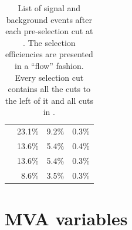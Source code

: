 \begin{table}[!tbp]
\begin{tabular}{lrrr}
\hline
\gammagamma{\Pphoton}{\BS}{\Pphoton}{\BS}{ \Pquark \Pquark \Pquark \Pquark}& 23.1\% & 9.2\%  & 0.3\%\\
\gammagamma{\Pphoton}{\BS}{\Pphoton}{\EPA}{ \Pquark \Pquark \Pquark \Pquark}& 13.6\% & 5.4\%  &0.4\%\\
\gammagamma{\Pphoton}{\EPA}{\Pphoton}{\BS}{ \Pquark \Pquark \Pquark \Pquark}& 13.6\% & 5.4\% & 0.3\%\\
\gammagamma{\Pphoton}{\EPA}{\Pphoton}{\EPA}{ \Pquark \Pquark \Pquark \Pquark}& 8.6\% & 3.5\% & 0.3\% \\
\hline \hline
\end{tabular}
\caption[List of signal and background samples after pre-selection cuts at .]
{List of signal and background events after each pre-selection cut at .  The selection efficiencies are presented in a ``flow'' fashion. Every selection cut contains all the cuts to the left of it and all  cuts in  .}
\label{tab:doubleHiggsPreslectionPart2}
\end{table}

\section{MVA variables}

